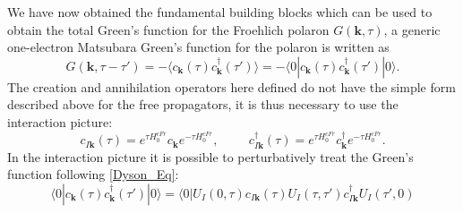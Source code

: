 \documentclass[12pt, a4paper]{report}
\numberwithin{equation}{section}
\begin{document}
We have now obtained the fundamental building blocks which can be used to obtain the total Green's function for the Froehlich polaron 
$G(\mathbf{k},\tau)$, a generic one-electron Matsubara Green's function for the polaron is written as 
\begin{equation}
    G(\mathbf{k},\tau-\tau')= -\langle c_\mathbf{k}(\tau)c^\dagger_\mathbf{k}(\tau')\rangle =-\langle 0|c_\mathbf{k}(\tau)c^\dagger_\mathbf{k}(\tau')|0\rangle.
\end{equation}
The creation and annihilation operators here defined do not have the simple form described above for the free propagators, it is thus 
necessary to use the interaction picture:
\begin{equation}
    c_{I\mathbf{k}}(\tau)=e^{\tau H^{cFr}_0}c_{\mathbf{k}}e^{-\tau H^{cFr}_0},\hspace{1cm}c^\dagger_{I\mathbf{k}}(\tau)=e^{\tau H^{cFr}_0}c^\dagger_{\mathbf{k}}e^{-\tau H^{cFr}_0}.
\end{equation}
In the interaction picture it is possible to perturbatively treat the Green's function following \ref{Dyson_Eq}:
\begin{equation}
    \langle 0| c_\mathbf{k}(\tau)c^\dagger_\mathbf{k}(\tau')|0\rangle=\langle 0| U_I(0,\tau)c_{I\mathbf{k}}(\tau)U_I(\tau,\tau')c^\dagger_{I\mathbf{k}}U_I(\tau',0)
\end{equation}
\printbibliography
\end{document}
